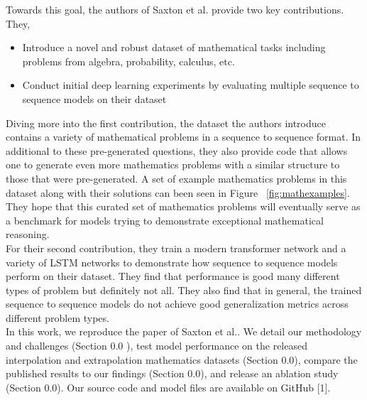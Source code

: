 Towards this goal, the authors of Saxton et al. \supercite{DBLP:journals/corr/abs-1904-01557}  provide two key contributions. They, 

\begin{itemize}
   \item Introduce a novel and robust dataset of mathematical tasks including problems from algebra, probability, calculus, etc.
   \item Conduct initial deep learning experiments by evaluating multiple sequence to sequence models on their dataset 
\end{itemize}

Diving more into the first contribution, the dataset the authors introduce contains a variety of mathematical problems in a sequence to sequence format. In additional to these pre-generated questions, they also provide code that allows one to generate even more mathematics problems with a similar structure to those that were pre-generated. A set of example mathematics problems in this dataset along with their solutions can been seen in Figure ~\ref{fig:mathexamples}. They hope that this curated set of mathematics problems will eventually serve as a benchmark for models trying to demonstrate exceptional mathematical reasoning.  \\


For their second contribution, they train a modern transformer network and a variety of LSTM networks \supercite{hochreiter1997long} to demonstrate how sequence to sequence models perform on their dataset. They find that performance is good many different types of problem but definitely not all. They also find that in general, the trained sequence to sequence models do not achieve good generalization metrics across different problem types.  \\ 


In this work, we reproduce the paper of Saxton et al.\supercite{DBLP:journals/corr/abs-1904-01557}. We detail our methodology and challenges (Section 0.0 ), test model performance on the released interpolation and extrapolation mathematics datasets (Section 0.0), compare the published results to our findings (Section 0.0),  and release an ablation study (Section 0.0).  Our source code and model files are available on GitHub [1].


